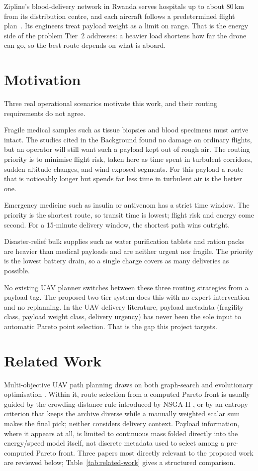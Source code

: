\documentclass{ssnreview}
\begin{document}
Zipline's blood-delivery network in Rwanda serves hospitals up to about 80\,km from its
distribution centre, and each aircraft follows a predetermined flight plan~\cite{r16}.
Its engineers treat payload weight as a limit on range. That is the energy side of the
problem Tier~2 addresses: a heavier load shortens how far the drone can go, so the best
route depends on what is aboard.

\section{Motivation}

Three real operational scenarios motivate this work, and their routing requirements do
not agree.

Fragile medical samples such as tissue biopsies and blood specimens must arrive intact.
The studies cited in the Background found no damage on ordinary flights, but an operator will still want such a payload kept out of rough air. The routing priority
is to minimise flight risk, taken here as time spent in turbulent corridors, sudden
altitude changes, and wind-exposed segments. For this payload a route that is noticeably
longer but spends far less time in turbulent air is the better one.

Emergency medicine such as insulin or antivenom has a strict time window. The priority
is the shortest route, so transit time is lowest; flight risk and energy come second.
For a 15-minute delivery window, the shortest path wins outright.

Disaster-relief bulk supplies such as water purification tablets and ration packs are
heavier than medical payloads and are neither urgent nor fragile. The priority is the
lowest battery drain, so a single charge covers as many deliveries as possible.

No existing UAV planner switches between these three routing strategies from a payload
tag. The proposed two-tier system does this with no expert intervention and no
replanning. In the UAV delivery literature, payload metadata (fragility class, payload
weight class, delivery urgency) has never been the sole input to automatic Pareto point
selection. That is the gap this project targets.


\section{Related Work}\label{sec:relatedwork}

Multi-objective UAV path planning draws on both graph-search and evolutionary
optimisation \cite{r11}. Within it, route selection from a computed Pareto
front is usually guided by the crowding-distance rule introduced by NSGA-II \cite{r8},
or by an entropy criterion that keeps the archive diverse while a manually weighted
scalar sum makes the final pick; neither considers delivery context. Payload
information, where it appears at all, is limited to continuous mass folded directly into
the energy/speed model itself, not discrete metadata used to select among a pre-computed
Pareto front. Three papers most directly
relevant to the proposed work are reviewed below; Table~\ref{tab:related-work} gives a
structured comparison.
\end{document}
